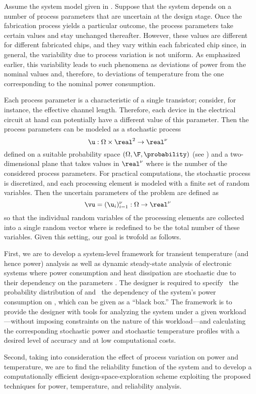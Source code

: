 Assume the system model given in . Suppose that the system
depends on a number of process parameters that are uncertain at the design
stage. Once the fabrication process yields a particular outcome, the process
parameters take certain values and stay unchanged thereafter. However, these
values are different for different fabricated chips, and they vary within each
fabricated chip since, in general, the variability due to process variation is
not uniform. As emphasized earlier, this variability leads to such phenomena as
deviations of power from the nominal values and, therefore, to deviations of
temperature from the one corresponding to the nominal power consumption.

Each process parameter is a characteristic of a single transistor; consider, for
instance, the effective channel length. Therefore, each device in the electrical
circuit at hand can potentially have a different value of this parameter. Then the
process parameters can be modeled as a stochastic process
\[
  \u: \Omega \times \real^2 \to \real^\nu
\]
defined on a suitable probability space $(\Omega, \F, \probability)$ (see
) and a two-dimensional plane that takes values in
$\real^\nu$ where \nu is the number of the considered process parameters. For
practical computations, the stochastic process is discretized, and each
processing element is modeled with a finite set of random variables. Then the
uncertain parameters of the problem are defined as
\[
  \vu = (\u_i)_{i = 1}^\nu: \Omega \to \real^\nu
\]
so that the individual random variables of the processing elements are collected
into a single random vector where \nu is redefined to be the total number of
these variables. Given this setting, our goal is twofold as follows.

First, we are to develop a system-level framework for transient temperature (and
hence power) analysis as well as dynamic steady-state analysis of electronic
systems where power consumption and heat dissipation are stochastic due to their
dependency on the parameters \vu. The designer is required to specify \one~the
probability distribution of \vu and \two~the dependency of the system's power
consumption on \vu, which can be given as a ``black box.'' The framework is to
provide the designer with tools for analyzing the system under a given
workload---without imposing constraints on the nature of this workload---and
calculating the corresponding stochastic power \mp and stochastic temperature
\mq profiles with a desired level of accuracy and at low computational costs.

Second, taking into consideration the effect of process variation on power and
temperature, we are to find the reliability function of the system and to
develop a computationally efficient design-space-exploration scheme exploiting
the proposed techniques for power, temperature, and reliability analysis.
